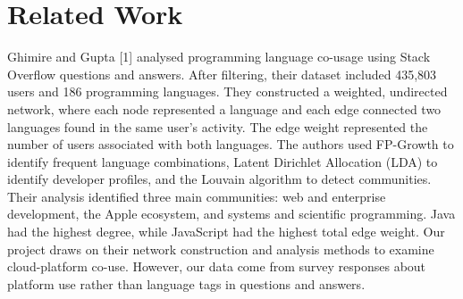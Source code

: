 \documentclass{article}
\begin{document}
\section{Related Work}
{\color{blue} Ghimire and Gupta [1] analysed programming language co-usage using Stack Overflow questions and answers. After filtering, their dataset included 435,803 users and 186 programming languages. They constructed a weighted, undirected network, where each node represented a language and each edge connected two languages found in the same user's activity. The edge weight represented the number of users associated with both languages. The authors used FP-Growth to identify frequent language combinations, Latent Dirichlet Allocation (LDA) to identify developer profiles, and the Louvain algorithm to detect communities. Their analysis identified three main communities: web and enterprise development, the Apple ecosystem, and systems and scientific programming. Java had the highest degree, while JavaScript had the highest total edge weight. Our project draws on their network construction and analysis methods to examine cloud-platform co-use. However, our data come from survey responses about platform use rather than language tags in questions and answers.}
\newpage
\end{document}
